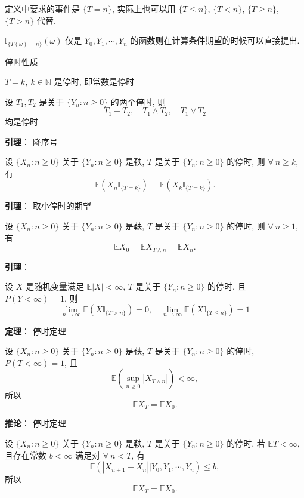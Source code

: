 \documentclass[openany]{ctexbook}
\theoremstyle{kaiti}
\theoremstyle{normal}
\begin{document}
定义中要求的事件是 $\{T=n\}$, 实际上也可以用 $\{T\leqslant n\}$, $\{T< n\}$, $\{T\geqslant n\}$, $\{T>n\}$ 代替.

$\mathbb{I}_{\{T(\omega)=n\}}(\omega)$ 仅是 $Y_0,Y_1,\cdots,Y_n$ 的函数则在计算条件期望的时候可以直接提出.

停时性质

$T=k,~k\in\mathbb{N}$ 是停时, 即常数是停时

设 $T_1,T_2$ 是关于 $\{Y_n:n\geqslant0\}$ 的两个停时, 则
\begin{equation}
  T_1+T_2,\quad T_1\wedge T_2,\quad T_1\vee T_2
\end{equation} 均是停时

\textbf{引理}： 降序号

设 $\{X_n:n\geqslant0\}$ 关于 $\{Y_n:n\geqslant0\}$ 是鞅, $T$ 是关于 $\{Y_n:n\geqslant0\}$ 的停时, 则 $\forall~n\geqslant k$, 有
\begin{equation}
  \mathbb{E}(X_n\mathbb{I}_{\{T=k\}})=\mathbb{E}(X_k\mathbb{I}_{\{T=k\}}).
\end{equation}

\textbf{引理}： 取小停时的期望

设 $\{X_n:n\geqslant0\}$ 关于 $\{Y_n:n\geqslant0\}$ 是鞅, $T$ 是关于 $\{Y_n:n\geqslant0\}$ 的停时, 则 $\forall~n\geqslant 1$, 有
\begin{equation}
  \mathbb{E}X_0=\mathbb{E}X_{T\wedge n}=\mathbb{E}X_n.
\end{equation}

\textbf{引理}：

设 $X$ 是随机变量满足 $\mathbb{E}|X|<\infty$, $T$ 是关于 $\{Y_n:n\geqslant0\}$ 的停时, 且 $P(Y<\infty)=1$, 则
\begin{equation}
  \lim_{n\to\infty}\mathbb{E}(X\mathbb{I}_{\{T>n\}})=0,\quad \lim_{n\to\infty}\mathbb{E}(X\mathbb{I}_{\{T\leqslant n\}})=1
\end{equation}

\textbf{定理}： 停时定理

设 $\{X_n:n\geqslant0\}$ 关于 $\{Y_n:n\geqslant0\}$ 是鞅, $T$ 是关于 $\{Y_n:n\geqslant0\}$ 的停时, $P(T<\infty)=1$, 且 
\begin{equation}
  \mathbb{E}\left(\sup_{n\geqslant0}|X_{T\wedge n}|\right)<\infty,
\end{equation}
所以 
\begin{equation}
  \mathbb{E}X_T=\mathbb{E}X_0.
\end{equation}

\textbf{推论}： 停时定理

设 $\{X_n:n\geqslant0\}$ 关于 $\{Y_n:n\geqslant0\}$ 是鞅, $T$ 是关于 $\{Y_n:n\geqslant0\}$ 的停时, 若 $\mathbb{E}T<\infty$, 且存在常数 $b<\infty$ 满足对 $\forall~n< T$, 有
\begin{equation}
  \mathbb{E}(|X_{n+1}-X_n|\big|Y_0,Y_1,\cdots,Y_n)\leqslant b,
\end{equation}
所以 
\begin{equation}
  \mathbb{E}X_T=\mathbb{E}X_0.
\end{equation}
\end{document}
